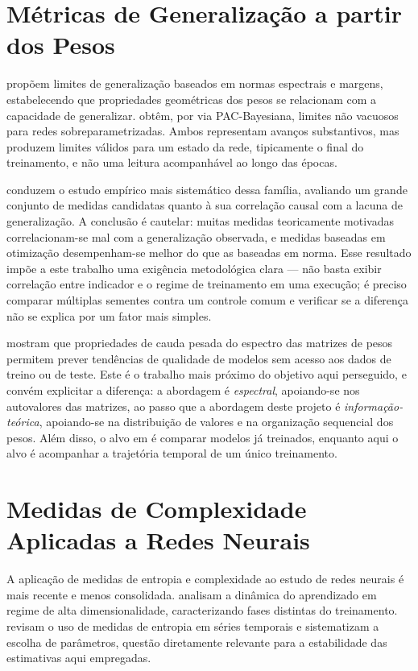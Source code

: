\section{Métricas de Generalização a partir dos Pesos}
\label{sec:E-pesos}

 propõem limites de generalização baseados em normas
espectrais e margens, estabelecendo que propriedades geométricas dos pesos se
relacionam com a capacidade de generalizar.  obtêm,
por via PAC-Bayesiana, limites não vacuosos para redes sobreparametrizadas.
Ambos representam avanços substantivos, mas produzem limites válidos para um
estado da rede, tipicamente o final do treinamento, e não uma leitura
acompanhável ao longo das épocas.

 conduzem o estudo empírico mais sistemático dessa
família, avaliando um grande conjunto de medidas candidatas quanto à sua
correlação causal com a lacuna de generalização. A conclusão é cautelar: muitas
medidas teoricamente motivadas correlacionam-se mal com a generalização
observada, e medidas baseadas em otimização desempenham-se melhor do que as
baseadas em norma. Esse resultado impõe a este trabalho uma exigência
metodológica clara --- não basta exibir correlação entre indicador e
o regime de treinamento em uma execução; é preciso comparar múltiplas
sementes contra um controle comum e verificar se a diferença não se explica por
um fator mais simples.

 mostram que propriedades de cauda pesada do espectro das
matrizes de pesos permitem prever tendências de qualidade de modelos sem acesso
aos dados de treino ou de teste. Este é o trabalho mais próximo do objetivo aqui
perseguido, e convém explicitar a diferença: a abordagem é \emph{espectral},
apoiando-se nos autovalores das matrizes, ao passo que a abordagem deste projeto
é \emph{informação-teórica}, apoiando-se na distribuição de valores e na
organização sequencial dos pesos. Além disso, o alvo em  é
comparar modelos já treinados, enquanto aqui o alvo é acompanhar a trajetória
temporal de um único treinamento.

\section{Medidas de Complexidade Aplicadas a Redes Neurais}
\label{sec:E-complexidade}

A aplicação de medidas de entropia e complexidade ao estudo de redes neurais é
mais recente e menos consolidada.  analisam a dinâmica do
aprendizado em regime de alta dimensionalidade, caracterizando fases distintas
do treinamento.  revisam o uso de medidas de
entropia em séries temporais e sistematizam a escolha de parâmetros, questão
diretamente relevante para a estabilidade das estimativas aqui empregadas.

